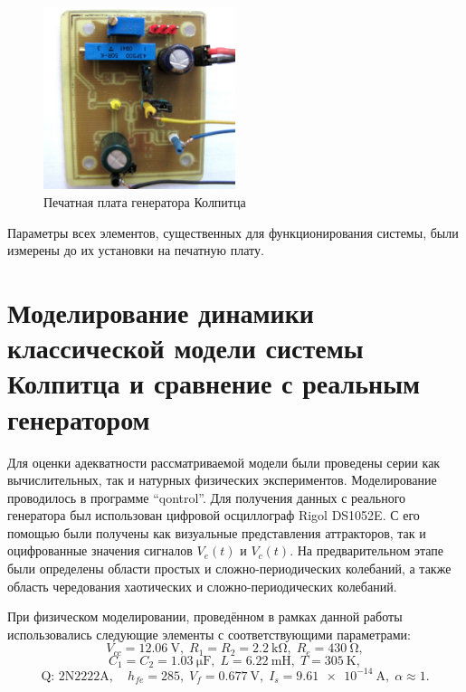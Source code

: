 \begin{figure}[htb!]
\centerline{\includegraphics[width=0.5\textwidth]{p/colp_board.jpg} }
\caption{Печатная плата генератора Колпитца}
\label{atu:f:colp_board}
\end{figure}

Параметры всех элементов, существенных для функционирования системы,
были измерены до их установки на печатную плату.


\section{Моделирование динамики классической модели системы Колпитца и сравнение с реальным генератором}  %

Для оценки адекватности рассматриваемой модели были проведены серии как
вычислительных, так и натурных физических экспериментов.
Моделирование проводилось в программе ``qontrol''.
Для получения данных с реального генератора был использован цифровой осциллограф
Rigol DS1052E. %
С его помощью были получены как визуальные представления
аттракторов, так и оцифрованные значения сигналов $V_e(t)$ и $V_c(t)$.
На предварительном этапе были определены области простых и сложно-периодических колебаний,
а также область чередования хаотических и сложно-периодических колебаний.

При физическом моделировании, проведённом в рамках данной работы использовались следующие
элементы с соответствующими параметрами:
%
\[
  V_{cc} = \SI{12.06}{\volt},          \;
  R_1 = R_2 = \SI{2.2}{\kilo\ohm},     \;
  R_e = \SI{430}{\ohm},
\]
%
\[
  C_1 = C_2 = \SI{1.03}{\micro\farad}, \;
  L = \SI{6.22}{\milli\henry},         \;
  T = \SI{305}{\kelvin},
\]
%
\[
  \text{Q: 2N2222A}, \quad
  h_{fe}=285, \;
  V_f = \SI{0.677}{\volt}, \;
  I_s = \SI{9.61e-14}{\ampere}, \;
  \alpha \approx 1.
\]

